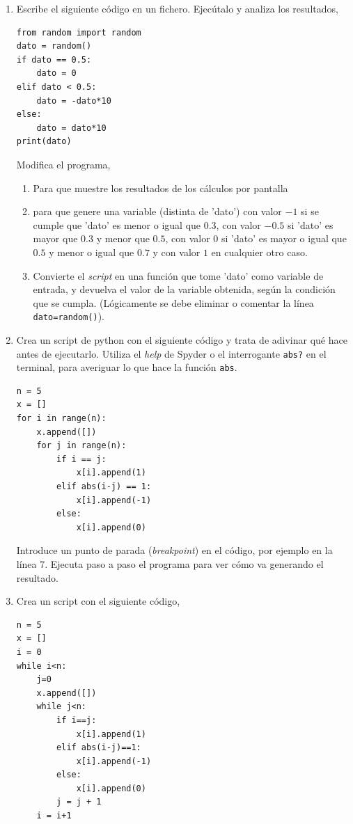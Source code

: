 \begin{enumerate}
\item Escribe el siguiente código en un fichero. Ejecútalo y analiza los resultados,
\begin{verbatim}
from random import random
dato = random()
if dato == 0.5:
    dato = 0
elif dato < 0.5:
    dato = -dato*10
else:
    dato = dato*10
print(dato)
\end{verbatim}

Modifica el programa,
\begin{enumerate}
\item Para que muestre los resultados de los cálculos por pantalla
\item para que genere una variable (distinta de 'dato') con valor $-1$ si se cumple que 'dato' es menor o igual que $0.3$, con valor $-0.5$ si 'dato' es mayor que $0.3$ y menor que $0.5$, con valor $0$ si 'dato' es mayor o igual que $0.5$ y menor  o igual que $0.7$ y con valor $1$ en cualquier otro caso.
\item Convierte el \emph{script} en una función que tome 'dato' como variable de entrada, y devuelva el valor de la variable obtenida, según la condición que se cumpla. (Lógicamente se debe eliminar o comentar la línea \verb|dato=random()|).
\end{enumerate}

\item Crea un script de python con el siguiente código y trata de adivinar qué hace antes de ejecutarlo. Utiliza el \emph{help} de Spyder o el interrogante \texttt{abs?} en el terminal, para averiguar lo que hace la función \verb|abs|.
\begin{verbatim}
n = 5
x = []
for i in range(n):
    x.append([])
    for j in range(n):
        if i == j:
            x[i].append(1)
        elif abs(i-j) == 1:
            x[i].append(-1)
        else:
            x[i].append(0)
\end{verbatim}
Introduce un punto de parada (\emph{breakpoint}) en el código, por ejemplo en la línea 7. Ejecuta paso a paso el programa para ver cómo va generando el resultado.

\item Crea un script con el siguiente código,
\begin{verbatim}
n = 5
x = []
i = 0
while i<n:
    j=0
    x.append([])
    while j<n:
        if i==j:
            x[i].append(1)
        elif abs(i-j)==1:
            x[i].append(-1)
        else:
            x[i].append(0)
        j = j + 1
    i = i+1
\end{verbatim}


\end{enumerate}

